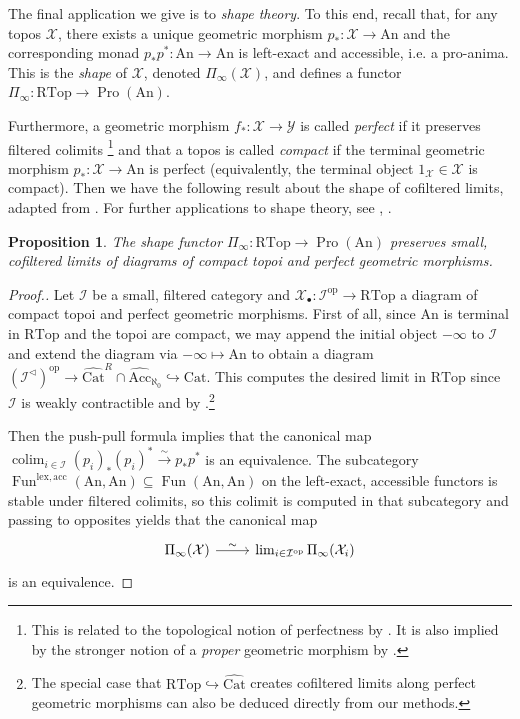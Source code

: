 \documentclass[a4paper,reqno,10pt]{amsart}
\newtheorem{proposition}[theorem]{Proposition}
\theoremstyle{definition}
\theoremstyle{remark}
\newcommand{\iso}{\stackrel{\sim}{\rightarrow}}
\newcommand{\I}{\mathcal{I}}
\newcommand{\X}{\mathcal{X}}
\newcommand{\Y}{\mathcal{Y}}
\DeclareMathOperator*{\colim}{colim}
\newcommand{\Fun}{\operatorname{Fun}}
\newcommand{\Cat}{\mathrm{Cat}}
\newcommand{\An}{\mathrm{An}}
\newcommand{\Acc}{\mathrm{Acc}}
\newcommand{\Pro}{\operatorname{Pro}}
\newcommand{\RTop}{\mathrm{RTop}}
\newcommand{\op}{\mathrm{op}}
\begin{document}
The final application we give is to \textit{shape theory}. To this end, recall that, for any topos $\X$, there exists a unique geometric morphism $p_{\ast}\colon\X\rightarrow\An$ and the corresponding monad $p_{\ast}p^{\ast}\colon\An\rightarrow\An$ is left-exact and accessible, i.e. a pro-anima. This is the \textit{shape} of $\X$, denoted $\Pi_{\infty}(\X)$, and defines a functor $\Pi_{\infty}\colon\RTop\rightarrow\Pro(\An)$.

Furthermore, a geometric morphism $f_{\ast}\colon\X\rightarrow\Y$ is called \textit{perfect} if it preserves filtered colimits \cite[Definition 24.5]{LehnerLectures}\footnote{This is related to the topological notion of perfectness by \cite[Theorem 3.50]{Lehner}. It is also implied by the stronger notion of a \textit{proper} geometric morphism by \cite[Remark 7.3.1.5]{HTT}.} and that a topos is called \textit{compact} if the terminal geometric morphism $p_{\ast}\colon\X\rightarrow\An$ is perfect (equivalently, the terminal object $1_{\X}\in\X$ is compact). Then we have the following result about the shape of cofiltered limits, adapted from \cite[Proposition 2.11, (1)]{Hoyois}. For further applications to shape theory, see \cite{Hoyois}, \cite[Lecture 24]{LehnerLectures}.

\begin{proposition}\label{ShapeCofiltered}
The shape functor $\Pi_{\infty}\colon\RTop\rightarrow\Pro(\An)$ preserves small, cofiltered limits of diagrams of compact topoi and perfect geometric morphisms.
\end{proposition}
\begin{proof}[Proof.]
Let $\I$ be a small, filtered category and $\X_{\bullet}\colon\I^{\op}\rightarrow\RTop$ a diagram of compact topoi and perfect geometric morphisms. First of all, since $\An$ is terminal in $\RTop$ and the topoi are compact, we may append the initial object $-\infty$ to $\I$ and extend the diagram via $-\infty\mapsto\An$ to obtain a diagram $(\I^{\triangleleft})^{\op}\rightarrow\widehat{\Cat}^R\cap\widehat{\Acc}_{\aleph_0}\hookrightarrow\Cat$. This computes the desired limit in $\RTop$ since $\I$ is weakly contractible and by \cite[Theorem 6.3.3.1]{HTT}.\footnote{The special case that $\RTop\hookrightarrow\widehat{\Cat}$ creates cofiltered limits along perfect geometric morphisms can also be deduced directly from our methods.}

Then the push-pull formula implies that the canonical map $\colim_{i\in\I}(p_i)_{\ast}(p_i)^{\ast}\iso p_{\ast}p^{\ast}$ is an equivalence. The subcategory $\Fun^{\mathrm{lex, acc}}(\An,\An)\subseteq\Fun(\An,\An)$ on the left-exact, accessible functors is stable under filtered colimits, so this colimit is computed in that subcategory and passing to opposites yields that the canonical map
\begin{equation*}
\begin{tikzcd}
\Pi_{\infty}(\X)\arrow[r,"\sim"] & \lim_{i\in\I^{\op}}\Pi_{\infty}(\X_i)
\end{tikzcd}
\end{equation*}
is an equivalence.
\end{proof}

\printbibliography
\end{document}
